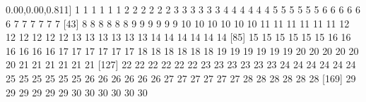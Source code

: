 \documentclass[
]{article}
\newenvironment{Shaded}{\begin{snugshade}}{\end{snugshade}}
\newcommand{\DecValTok}[1]{\textcolor[rgb]{0.00,0.00,0.81}{#1}}
\newcommand{\NormalTok}[1]{#1}
\begin{document}
\begin{Shaded}
\begin{Highlighting}[]
\NormalTok{[}\DecValTok{1}\NormalTok{] }\DecValTok{1} \DecValTok{1} \DecValTok{1} \DecValTok{1} \DecValTok{1} \DecValTok{1} \DecValTok{2} \DecValTok{2} \DecValTok{2} \DecValTok{2} \DecValTok{2} \DecValTok{2} \DecValTok{3} \DecValTok{3} \DecValTok{3} \DecValTok{3} \DecValTok{3} \DecValTok{3} \DecValTok{4} \DecValTok{4} \DecValTok{4} \DecValTok{4} \DecValTok{4} \DecValTok{4} \DecValTok{5} \DecValTok{5} \DecValTok{5} \DecValTok{5} \DecValTok{5} \DecValTok{5} \DecValTok{6} \DecValTok{6} \DecValTok{6} \DecValTok{6} \DecValTok{6} \DecValTok{6} \DecValTok{7} \DecValTok{7} \DecValTok{7} \DecValTok{7} \DecValTok{7} \DecValTok{7}
\NormalTok{[}\DecValTok{43}\NormalTok{] }\DecValTok{8} \DecValTok{8} \DecValTok{8} \DecValTok{8} \DecValTok{8} \DecValTok{8} \DecValTok{9} \DecValTok{9} \DecValTok{9} \DecValTok{9} \DecValTok{9} \DecValTok{9} \DecValTok{10} \DecValTok{10} \DecValTok{10} \DecValTok{10} \DecValTok{10} \DecValTok{10} \DecValTok{11} \DecValTok{11} \DecValTok{11} \DecValTok{11} \DecValTok{11} \DecValTok{11} \DecValTok{12} \DecValTok{12} \DecValTok{12} \DecValTok{12} \DecValTok{12} \DecValTok{12} \DecValTok{13} \DecValTok{13} \DecValTok{13} \DecValTok{13} \DecValTok{13} \DecValTok{13} \DecValTok{14} \DecValTok{14} \DecValTok{14} \DecValTok{14} \DecValTok{14} \DecValTok{14}
\NormalTok{[}\DecValTok{85}\NormalTok{] }\DecValTok{15} \DecValTok{15} \DecValTok{15} \DecValTok{15} \DecValTok{15} \DecValTok{15} \DecValTok{16} \DecValTok{16} \DecValTok{16} \DecValTok{16} \DecValTok{16} \DecValTok{16} \DecValTok{17} \DecValTok{17} \DecValTok{17} \DecValTok{17} \DecValTok{17} \DecValTok{17} \DecValTok{18} \DecValTok{18} \DecValTok{18} \DecValTok{18} \DecValTok{18} \DecValTok{18} \DecValTok{19} \DecValTok{19} \DecValTok{19} \DecValTok{19} \DecValTok{19} \DecValTok{19} \DecValTok{20} \DecValTok{20} \DecValTok{20} \DecValTok{20} \DecValTok{20} \DecValTok{20} \DecValTok{21} \DecValTok{21} \DecValTok{21} \DecValTok{21} \DecValTok{21} \DecValTok{21}
\NormalTok{[}\DecValTok{127}\NormalTok{] }\DecValTok{22} \DecValTok{22} \DecValTok{22} \DecValTok{22} \DecValTok{22} \DecValTok{22} \DecValTok{23} \DecValTok{23} \DecValTok{23} \DecValTok{23} \DecValTok{23} \DecValTok{23} \DecValTok{24} \DecValTok{24} \DecValTok{24} \DecValTok{24} \DecValTok{24} \DecValTok{24} \DecValTok{25} \DecValTok{25} \DecValTok{25} \DecValTok{25} \DecValTok{25} \DecValTok{25} \DecValTok{26} \DecValTok{26} \DecValTok{26} \DecValTok{26} \DecValTok{26} \DecValTok{26} \DecValTok{27} \DecValTok{27} \DecValTok{27} \DecValTok{27} \DecValTok{27} \DecValTok{27} \DecValTok{28} \DecValTok{28} \DecValTok{28} \DecValTok{28} \DecValTok{28} \DecValTok{28}
\NormalTok{[}\DecValTok{169}\NormalTok{] }\DecValTok{29} \DecValTok{29} \DecValTok{29} \DecValTok{29} \DecValTok{29} \DecValTok{29} \DecValTok{30} \DecValTok{30} \DecValTok{30} \DecValTok{30} \DecValTok{30} \DecValTok{30}
\end{Highlighting}
\end{Shaded}
\end{document}

